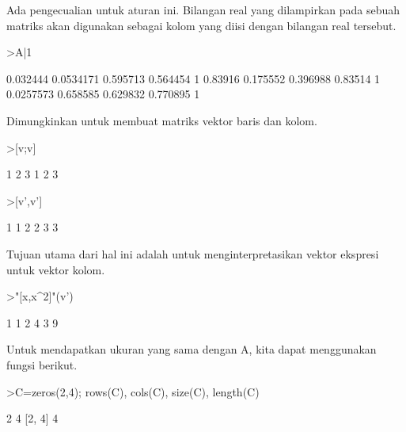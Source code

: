 \documentclass{article}
\begin{document}
\begin{eulernotebook}
\begin{eulercomment}
Ada pengecualian untuk aturan ini. Bilangan real yang dilampirkan pada
sebuah matriks akan digunakan sebagai kolom yang diisi dengan bilangan
real tersebut.
\end{eulercomment}
\begin{eulerprompt}
>A|1
\end{eulerprompt}
\begin{euleroutput}
       0.032444     0.0534171      0.595713      0.564454             1 
        0.83916      0.175552      0.396988       0.83514             1 
      0.0257573      0.658585      0.629832      0.770895             1 
\end{euleroutput}
\begin{eulercomment}
Dimungkinkan untuk membuat matriks vektor baris dan kolom.
\end{eulercomment}
\begin{eulerprompt}
>[v;v]
\end{eulerprompt}
\begin{euleroutput}
              1             2             3 
              1             2             3 
\end{euleroutput}
\begin{eulerprompt}
>[v',v']
\end{eulerprompt}
\begin{euleroutput}
              1             1 
              2             2 
              3             3 
\end{euleroutput}
\begin{eulercomment}
Tujuan utama dari hal ini adalah untuk menginterpretasikan vektor
ekspresi untuk vektor kolom.
\end{eulercomment}
\begin{eulerprompt}
>"[x,x^2]"(v')
\end{eulerprompt}
\begin{euleroutput}
              1             1 
              2             4 
              3             9 
\end{euleroutput}
\begin{eulercomment}
Untuk mendapatkan ukuran yang sama dengan A, kita dapat menggunakan
fungsi berikut.
\end{eulercomment}
\begin{eulerprompt}
>C=zeros(2,4); rows(C), cols(C), size(C), length(C)
\end{eulerprompt}
\begin{euleroutput}
  2
  4
  [2,  4]
  4
\end{euleroutput}
\begin{eulercomment}

\end{eulercomment}
\end{eulernotebook}
\end{document}

